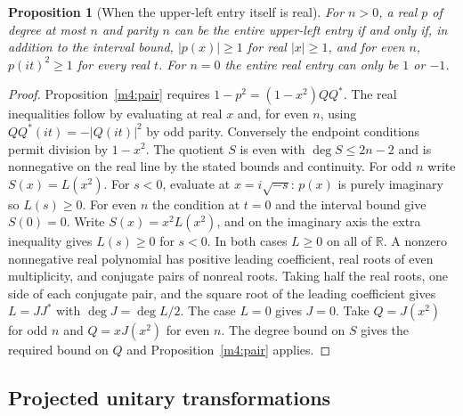 \documentclass[11pt,reqno]{amsart}
\newtheorem{proposition}[theorem]{Proposition}
\theoremstyle{definition}
\theoremstyle{remark}
\numberwithin{equation}{section}
\newcommand{\R}{\mathbb{R}}
\begin{document}
\begin{proposition}[When the upper-left entry itself is real]\label{m4:direct}
For $n>0$, a real $p$ of degree at most $n$ and parity $n$ can be the entire upper-left entry if and only if, in addition to the interval bound, $|p(x)|\ge1$ for real $|x|\ge1$, and for even $n$, $p(it)^2\ge1$ for every real $t$. For $n=0$ the entire real entry can only be $1$ or $-1$.
\end{proposition}
\begin{proof}
Proposition~\ref{m4:pair} requires $1-p^2=(1-x^2)QQ^*$. The real inequalities follow by evaluating at real $x$ and, for even $n$, using $QQ^*(it)=-|Q(it)|^2$ by odd parity. Conversely the endpoint conditions permit division by $1-x^2$. The quotient $S$ is even with $\deg S\le2n-2$ and is nonnegative on the real line by the stated bounds and continuity. For odd $n$ write $S(x)=L(x^2)$. For $s<0$, evaluate at $x=i\sqrt{-s}$: $p(x)$ is purely imaginary so $L(s)\ge0$. For even $n$ the condition at $t=0$ and the interval bound give $S(0)=0$. Write $S(x)=x^2L(x^2)$, and on the imaginary axis the extra inequality gives $L(s)\ge0$ for $s<0$. In both cases $L\ge0$ on all of $\R$. A nonzero nonnegative real polynomial has positive leading coefficient, real roots of even multiplicity, and conjugate pairs of nonreal roots. Taking half the real roots, one side of each conjugate pair, and the square root of the leading coefficient gives $L=JJ^*$ with $\deg J=\deg L/2$. The case $L=0$ gives $J=0$. Take $Q=J(x^2)$ for odd $n$ and $Q=xJ(x^2)$ for even $n$. The degree bound on $S$ gives the required bound on $Q$ and Proposition~\ref{m4:pair} applies.
\end{proof}

\subsection{Projected unitary transformations}
\end{document}
